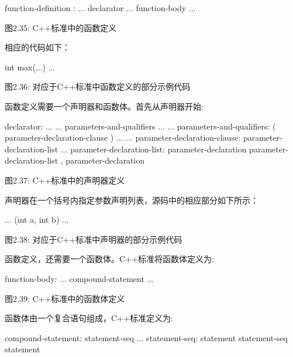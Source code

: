 \begin{shell}
function-definition :
    ... declarator ... function-body
    ...
\end{shell}

\begin{center}
图2.35: C++标准中的函数定义
\end{center}

相应的代码如下：

\begin{cpp}
int max(...) {
  ...
}
\end{cpp}

\begin{center}
图2.36: 对应于C++标准中函数定义的部分示例代码
\end{center}

函数定义需要一个声明器和函数体。首先从声明器开始:

\begin{shell}
declarator:
        ...
        ... parameters-and-qualifiers ...
...
parameters-and-qualifiers:
        ( parameter-declaration-clause ) ...
...
parameter-declaration-clause:
        parameter-declaration-list ...
parameter-declaration-list:
        parameter-declaration
        parameter-declaration-list , parameter-declaration
\end{shell}

\begin{center}
图2.37: C++标准中的声明器定义
\end{center}

声明器在一个括号内指定参数声明列表，源码中的相应部分如下所示：

\begin{cpp}
... (int a, int b)
...
\end{cpp}

\begin{center}
图2.38: 对应于C++标准中声明器的部分示例代码
\end{center}

函数定义，还需要一个函数体。C++标准将函数体定义为:

\begin{shell}
function-body:
    ... compound-statement
    ...
\end{shell}

\begin{center}
图2.39: C++标准中的函数体定义
\end{center}

函数体由一个复合语句组成，C++标准定义为:

\begin{shell}
compound-statement:
    { statement-seq ... }
statement-seq:
    statement
    statement-seq statement
\end{shell}

